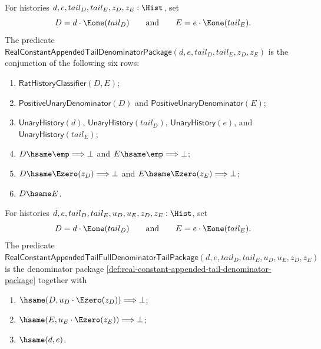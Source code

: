 \begin{definition}
\label{def:real-constant-appended-tail-denominator-package}
For histories $d,e,tail_D,tail_E,z_D,z_E:\Hist$, set
$$
D=d\cdot\Eone(tail_D)
\qquad\text{and}\qquad
E=e\cdot\Eone(tail_E).
$$
The predicate
$\mathsf{RealConstantAppendedTailDenominatorPackage}(d,e,tail_D,tail_E,z_D,z_E)$
is the conjunction of the following six rows:
\begin{enumerate}
  \item $\mathsf{RatHistoryClassifier}(D,E)$;
  \item $\mathsf{PositiveUnaryDenominator}(D)$ and
  $\mathsf{PositiveUnaryDenominator}(E)$;
  \item $\mathsf{UnaryHistory}(d)$, $\mathsf{UnaryHistory}(tail_D)$,
  $\mathsf{UnaryHistory}(e)$, and $\mathsf{UnaryHistory}(tail_E)$;
  \item $D\hsame\emp\Longrightarrow\bot$ and
  $E\hsame\emp\Longrightarrow\bot$;
  \item $D\hsame\Ezero(z_D)\Longrightarrow\bot$ and
  $E\hsame\Ezero(z_E)\Longrightarrow\bot$;
  \item $D\hsame E$.
\end{enumerate}
\end{definition}
\begin{definition}
\label{def:real-constant-appended-tail-full-denominator-tail-package}
For histories $d,e,tail_D,tail_E,u_D,u_E,z_D,z_E:\Hist$, set
$$
D=d\cdot\Eone(tail_D)
\qquad\text{and}\qquad
E=e\cdot\Eone(tail_E).
$$
The predicate
$\mathsf{RealConstantAppendedTailFullDenominatorTailPackage}
(d,e,tail_D,tail_E,u_D,u_E,z_D,z_E)$ is the denominator package
\autoref{def:real-constant-appended-tail-denominator-package} together with
\begin{enumerate}
  \item $\hsame(D,u_D\cdot\Ezero(z_D))\Longrightarrow\bot$;
  \item $\hsame(E,u_E\cdot\Ezero(z_E))\Longrightarrow\bot$;
  \item $\hsame(d,e)$.
\end{enumerate}
\end{definition}
